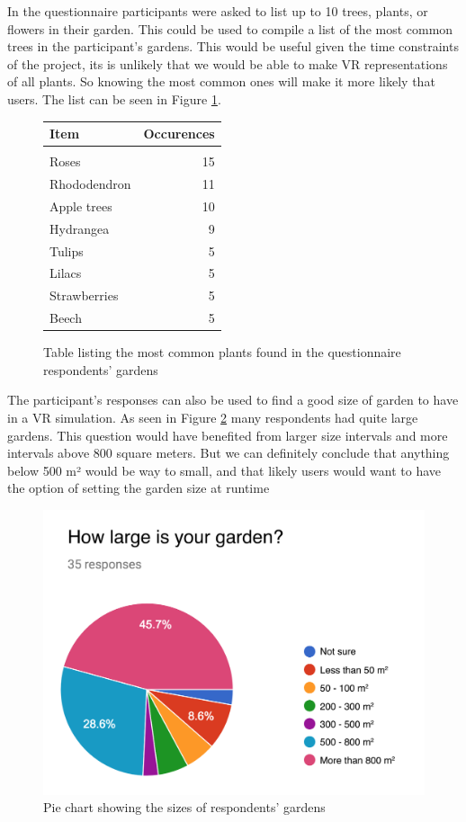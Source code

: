 	In the questionnaire participants were asked to list up to 10 trees, plants, or flowers in their garden. This could be used to compile a list of the most common trees in the participant's gardens. This would be useful given the time constraints of the project, its is unlikely that we would be able to make VR representations of all plants. So knowing the most common ones will make it more likely that users. The list can be seen in Figure \ref{fig:plantlist}.
	\begin{figure}[H]
		\begin{center}
			\begin{tabular}{  l  r }
				Item & Occurences  \\ \hline
				& \\
				Roses & 15 \\ 
				Rhododendron & 11  \\ 
				Apple trees & 10  \\ 
				Hydrangea & 9  \\ 
				Tulips & 5  \\ 
				Lilacs & 5  \\ 
				Strawberries & 5  \\ 
				Beech & 5  \\
			\end{tabular}
		\end{center}
		\caption{Table listing the most common plants found in the questionnaire respondents' gardens}
		\label{fig:plantlist}
	\end{figure}
	The participant's responses can also be used to find a good size of garden to have in a VR simulation. As seen in Figure \ref{fig:gardensize} many respondents had quite large gardens. This question would have benefited from larger size intervals and more intervals above 800 square meters. But we can definitely conclude that anything below 500 m² would be way to small, and that likely users would want to have the option of setting the garden size at runtime \\
	\begin{figure}[H]
		\centering
		\includegraphics[width=0.5\linewidth]{figure/Analysis/gardensize.png}
		\caption{Pie chart showing the sizes of respondents' gardens}
		\label{fig:gardensize}
	\end{figure}
